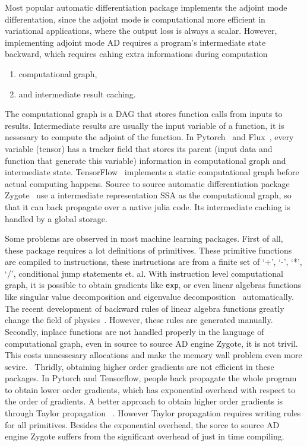 \documentclass[aps,twocolumn,longbibliography,english,superscriptaddress,prr]{revtex4-1}
\newcommand{\<}{\langle}
\renewcommand{\>}{\rangle}
\theoremstyle{definition}\newtheorem{definition}{\textit{Definition}}
\begin{document}
Most popular automatic differentiation package implements the adjoint mode differentation, since the adjoint mode is computational more efficient in variational applications, where the output loss is always a scalar.
However, implementing adjoint mode AD requires a program's intermediate state backward, which requires cahing extra informations during computation
\begin{enumerate}
    \item computational graph,
    \item and intermediate result caching.
\end{enumerate}
The computational graph is a DAG that stores function calls from inputs to results. Intermediate results are usually the input variable of a function, it is nessesary to compute the adjoint of the function.
In Pytorch~\cite{Paszke2017} and Flux~\cite{Innes2018}, every variable (tensor) has a tracker field that stores its parent (input data and function that generate this variable) information in computational graph and intermediate state. TensorFlow~\cite{Tensorflow2015} implements a static computational graph before actual computing happens.
Source to source automatic differentiation package Zygote~\cite{Innes2019} use a intermediate representation SSA as the computational graph, so that it can back propagate over a native julia code. Its intermediate caching is handled by a global storage.

Some problems are observed in most machine learning packages. First of all, these package requires a lot definitions of primitives.
    These primitive functions are compiled to instructions, these instructions are from a finite set of `+', `-', `*', `/', conditional jump statements et. al. With instruction level computational graph, it is possible to obtain gradients like \texttt{exp}, or even linear algebras functions like singular value decomposition and eigenvalue decomposition~\cite{Seeger2017,Wan2019,Hubig2019} automatically. The recent development of backward rules of linear algebra functions greatly change the field of physics~\cite{Xie2020,Liao2019}. However, these rules are generated manually.
    Secondly, inplace functions are not handled properly in the language of computational graph, even in source to source AD engine Zygote, it is not trivil. This costs unnessesary allocations and make the memory wall problem even more sevire.~\cite{memorywall}
    Thridly, obtaining higher order gradients are not efficient in these packages. In Pytorch and Tensorflow, people back propagate the whole program to obtain lower order gradients, which has exponential overhead with respect to the order of gradients. A better approach to obtain higher order gradients is through Taylor propagation ~\cite{Bettencourt2019}. However Taylor propagation requires writing rules for all primitives. Besides the exponential overhead, the sorce to source AD engine Zygote suffers from the significant overhead of just in time compiling.
\end{document}
